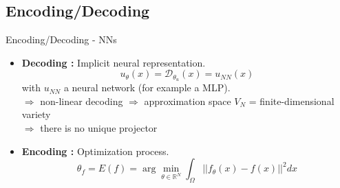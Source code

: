 \subsection{Encoding/Decoding}

\begin{frame}{Encoding/Decoding - NNs}
	\begin{itemize}[\textbullet]
		\item \textbf{Decoding :} Implicit neural representation.
		\begin{equation*}
			u_\theta(x)=\mathcal{D}_{\theta_u}(x)=u_{NN}(x)
		\end{equation*}
		with $u_{NN}$ a neural network (for example a MLP). \\
		$\Rightarrow$ non-linear decoding $\Rightarrow$ approximation space $V_N$ = finite-dimensional variety \\
		$\Rightarrow$ there is no unique projector
		\item \textbf{Encoding :} Optimization process.
		\begin{equation*}
			\theta_f=E(f)=\arg\min_{\theta\in\mathbb{R}^N}\int_\Omega ||f_\theta(x)-f(x)||^2 dx
		\end{equation*}
	\end{itemize}
\end{frame}

